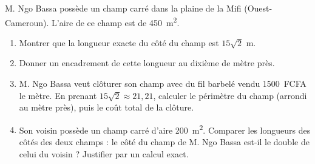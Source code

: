 \documentclass[11pt]{article}
\begin{document}
\begin{exercice}
M. Ngo Bassa possède un champ carré dans la plaine de la Mifi (Ouest-Cameroun). L'aire de ce champ est de \SI{450}{\meter\squared}.
\begin{enumerate}
\item Montrer que la longueur exacte du côté du champ est $15\sqrt{2}$ \si{\meter}.
\item Donner un encadrement de cette longueur au dixième de mètre près.
\item M. Ngo Bassa veut clôturer son champ avec du fil barbelé vendu \SI{1500}{FCFA} le mètre. En prenant $15\sqrt{2} \approx 21{,}21$, calculer le périmètre du champ (arrondi au mètre près), puis le coût total de la clôture.
\item Son voisin possède un champ carré d'aire \SI{200}{\meter\squared}. Comparer les longueurs des côtés des deux champs : le côté du champ de M. Ngo Bassa est-il le double de celui du voisin ? Justifier par un calcul exact.
\end{enumerate}
\end{exercice}
\end{document}
